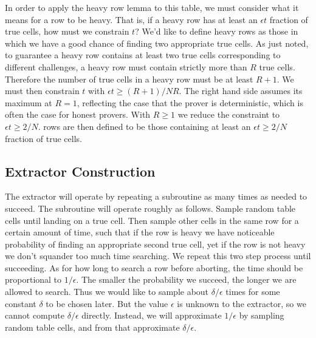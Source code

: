 In order to apply the heavy row lemma to this table, we must consider what it means for a row to be heavy.
That is, if a heavy row has at least an $\epsilon t$ fraction of true cells, how must we constrain $t$?
We'd like to define heavy rows as those in which we have a good chance of finding two appropriate true cells.
As just noted, to guarantee a heavy row contains at least two true cells corresponding to different challenges, a heavy row must contain strictly more than $R$ true cells.
Therefore the number of true cells in a heavy row must be at least $R+1$.
We must then constrain $t$ with $\epsilon t \geq (R+1)/NR$.
The right hand side assumes its maximum at $R=1$, reflecting the case that the prover is deterministic, which is often the case for honest provers.
With $R \geq 1$ we reduce the constraint to $\epsilon t \geq 2/N$.
 rows are then defined to be those containing at least an $\epsilon t \geq 2/N$ fraction of true cells.


\subsection{Extractor Construction}

The extractor will operate by repeating a subroutine as many times as needed to succeed.
The subroutine will operate roughly as follows.
Sample random table cells until landing on a true cell.
Then sample other cells in the same row for a certain amount of time, such that if the row is heavy we have noticeable probability of finding an appropriate second true cell, yet if the row is not heavy we don't squander too much time searching.
We repeat this two step process until succeeding.
As for how long to search a row before aborting, the time should be proportional to $1/\epsilon$.
The smaller the probability we succeed, the longer we are allowed to search.
Thus we would like to sample about $\delta/\epsilon$ times for some constant $\delta$ to be chosen later.
But the value $\epsilon$ is unknown to the extractor, so we cannot compute $\delta/\epsilon$ directly.
Instead, we will approximate $1/\epsilon$ by sampling random table cells, and from that approximate $\delta/\epsilon$.

